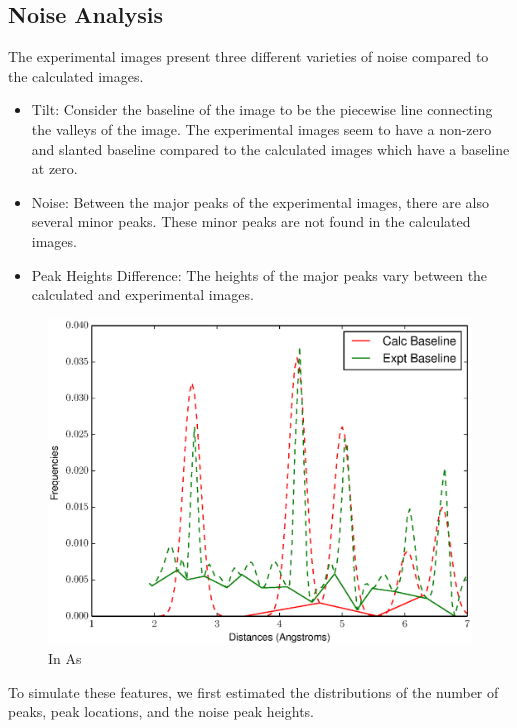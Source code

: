 \documentclass[12pt,letterpaper]{article}
\begin{document}
\clearpage

\subsection{Noise Analysis}
The experimental images present three different varieties of noise compared to
the calculated images.

\begin{itemize}
  \item{Tilt: Consider the baseline of the image to be the piecewise line
      connecting the valleys of the image. The experimental images seem to have a
      non-zero and slanted baseline compared to the calculated images which 
      have a baseline at zero.} 
  \item{Noise: Between the major peaks of the experimental images, there are
      also several minor peaks. These minor peaks are not found in the calculated
      images.}
  \item{Peak Heights Difference: The heights of the major peaks vary between the
      calculated and experimental images.}
\end{itemize}

\begin{figure}[ht]
  \begin{center}
    \includegraphics[scale=0.7]{figs/inas_valleys.eps}
    \caption{In As}
  \end{center}
\end{figure}

To simulate these features, we first estimated the distributions of the number of
peaks, peak locations, and the noise peak heights. 
\end{document}
